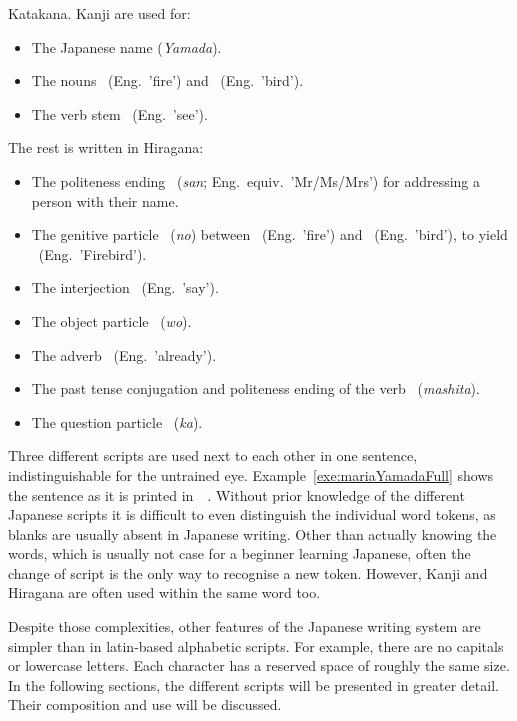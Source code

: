 Katakana. Kanji are used for:
\begin{itemize}
\item The Japanese name  (\emph{Yamada}).
\item The nouns ~(Eng.\ 'fire') and 
      ~(Eng.\ 'bird').
\item The verb stem ~(Eng.\ 'see').
\end{itemize}
The rest is written in Hiragana:
\begin{itemize}
  \item The politeness ending ~(\emph{san}; 
        Eng.\ equiv.\ 'Mr/Ms/Mrs') for addressing a person with their name.
  \item The genitive particle ~(\emph{no}) between 
        ~(Eng.\ 'fire') and ~(Eng.\ 'bird'), to yield 
        ~(Eng.\ 'Firebird').
  \item The interjection ~(Eng.\ 'say').
  \item The object particle ~(\emph{wo}).
  \item The adverb ~(Eng.\ 'already').
  \item The past tense conjugation and politeness ending of the 
        verb ~(\emph{mashita}).
  \item The question particle ~(\emph{ka}).
\end{itemize}

Three different scripts are used next to each other in one sentence,
indistinguishable for the untrained eye. Example~\ref{exe:mariaYamadaFull} 
shows the sentence as it is printed 
in~~\citeyear{Katsuki2006Book}. Without prior
knowledge of the different Japanese scripts it is difficult to even distinguish
the individual word tokens, as blanks are usually absent in Japanese writing.
Other than actually knowing the words, which is usually not case for a 
beginner learning Japanese, often the change of script is the only way to 
recognise a new token. However, Kanji and Hiragana are often used within the same
word too.

Despite those complexities, other features of the Japanese writing system are 
simpler than in latin-based alphabetic scripts. 
For example, there are no capitals or lowercase letters.
Each character has a reserved space of roughly the same size.
In the following sections, the different scripts will be presented in greater 
detail. Their composition and use will be discussed.


